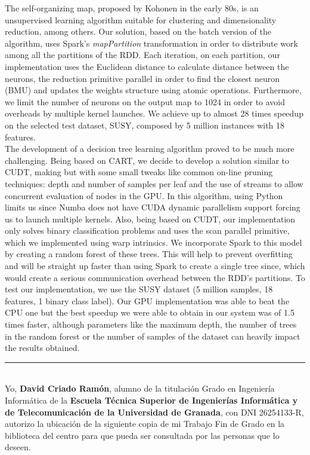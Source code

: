The self-organizing map, proposed by Kohonen in the early 80s, is an unsupervised learning algorithm suitable for clustering and dimensionality reduction, among others. Our solution, based on the batch version of the algorithm, uses Spark's \textit{mapPartition} transformation in order to distribute work among all the partitions of the RDD. Each iteration, on each partition, our implementation uses the Euclidean distance to calculate distance between the neurons, the reduction primitive parallel in order to find the closest neuron (BMU) and updates the weights structure using atomic operations. Furthermore, we limit the number of neurons on the output map to 1024 in order to avoid overheads by multiple kernel launches. We achieve up to almost 28 times speedup on the selected test dataset, SUSY, composed by 5 million instances with 18 features.\\

The development of a decision tree learning algorithm proved to be much more challenging. Being based on CART, we decide to develop a solution similar to CUDT, making but with some small tweaks like common on-line pruning techniques: depth and number of samples per leaf and the use of streams to allow concurrent evaluation of nodes in the GPU. In this algorithm, using Python limits us since Numba does not have CUDA dynamic parallelism support forcing us to launch multiple kernels. Also, being based on CUDT, our implementation only solves binary classification problems and uses the scan parallel primitive, which we implemented using warp intrinsics. We incorporate Spark to this model by creating a random forest of these trees. This will help to prevent overfitting and will be straight up faster than using Spark to create a single tree since, which would create a serious communication overhead between the RDD's partitions. To test our implementation, we use the SUSY dataset (5 million samples, 18 features, 1 binary class label). Our GPU implementation was able to beat the CPU one but the best speedup we were able to obtain in our system was of 1.5 times faster, although parameters like the maximum depth, the number of trees in the random forest or the number of samples of the dataset can heavily impact the results obtained.

\newpage
\thispagestyle{empty}

\noindent\rule[-1ex]{\textwidth}{2pt}\\[4.5ex]

Yo, \textbf{David Criado Ramón}, alumno de la titulación Grado en Ingeniería Informática de la \textbf{Escuela Técnica Superior
de Ingenierías Informática y de Telecomunicación de la Universidad de Granada}, con DNI 26254133-R, autorizo la
ubicación de la siguiente copia de mi Trabajo Fin de Grado en la biblioteca del centro para que pueda ser
consultada por las personas que lo deseen.

